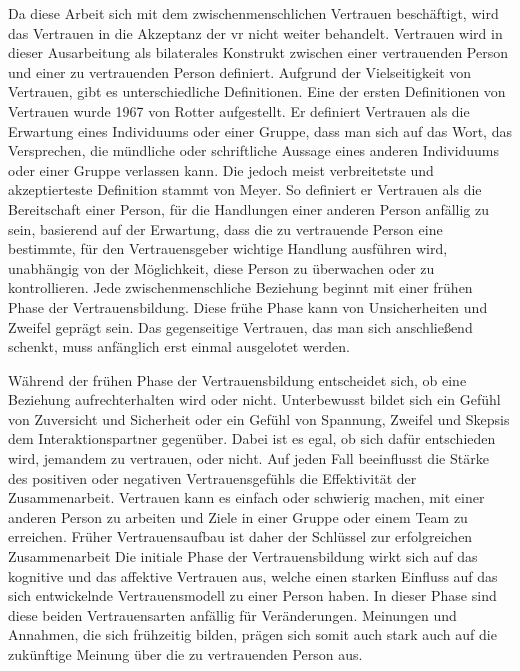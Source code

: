 \documentclass[a4paper,11pt]{article}%
\renewcommand{\\}{\vspace*{0.5\baselineskip} \newline}
\begin{document}
Da diese Arbeit sich mit dem zwischenmenschlichen Vertrauen beschäftigt, wird das Vertrauen in die Akzeptanz der \ac{vr} nicht weiter behandelt.
Vertrauen wird in dieser Ausarbeitung als bilaterales Konstrukt zwischen einer vertrauenden Person und einer zu vertrauenden Person definiert.
Aufgrund der Vielseitigkeit von Vertrauen, gibt es unterschiedliche Definitionen. \newline
Eine der ersten Definitionen von Vertrauen wurde 1967 von Rotter aufgestellt. Er definiert Vertrauen als 
\\
\dq{}die Erwartung eines Individuums oder einer Gruppe, dass man sich auf das Wort, das Versprechen, die mündliche oder schriftliche Aussage eines anderen Individuums oder einer Gruppe verlassen kann\dq{}. \citep[p.651]{rotter1967new}
\\
Die jedoch meist verbreitetste und akzeptierteste Definition stammt von Meyer.\citep[p.712]{mayer1995integrative} So definiert er Vertrauen als 
\\ 
\dq{}die Bereitschaft einer Person, für die Handlungen einer anderen Person anfällig zu sein, basierend auf der Erwartung, dass die zu vertrauende Person eine bestimmte, für den Vertrauensgeber wichtige Handlung ausführen wird, unabhängig von der Möglichkeit, diese Person zu überwachen oder zu kontrollieren.\dq{}
\\
Jede zwischenmenschliche Beziehung beginnt mit einer frühen Phase der Vertrauensbildung. Diese frühe Phase kann von Unsicherheiten und Zweifel geprägt sein. Das gegenseitige Vertrauen, das man sich anschließend schenkt, muss anfänglich erst einmal ausgelotet werden. 

Während der frühen Phase der Vertrauensbildung entscheidet sich, ob eine Beziehung aufrechterhalten wird oder nicht. Unterbewusst bildet sich ein Gefühl von Zuversicht und Sicherheit oder ein Gefühl von Spannung, Zweifel und Skepsis dem Interaktionspartner gegenüber. 
Dabei ist es egal, ob sich dafür entschieden wird, jemandem zu vertrauen, oder nicht. Auf jeden Fall beeinflusst die Stärke des positiven oder negativen Vertrauensgefühls die Effektivität der Zusammenarbeit. Vertrauen kann es einfach oder schwierig machen, mit einer anderen Person zu arbeiten und Ziele in einer Gruppe oder einem Team zu erreichen.
Früher Vertrauensaufbau ist daher der Schlüssel zur erfolgreichen Zusammenarbeit \citep[p.405-406]{bigley1998straining}
Die initiale Phase der Vertrauensbildung wirkt sich auf das kognitive und das affektive Vertrauen aus, welche einen starken Einfluss auf das sich entwickelnde Vertrauensmodell zu einer Person haben. In dieser Phase sind diese beiden Vertrauensarten anfällig für Veränderungen. \citep[p.461-462]{baldwin1992relational}
Meinungen und Annahmen, die sich frühzeitig bilden, prägen sich somit auch stark auch auf die zukünftige Meinung über die zu vertrauenden Person aus.
\end{document}
